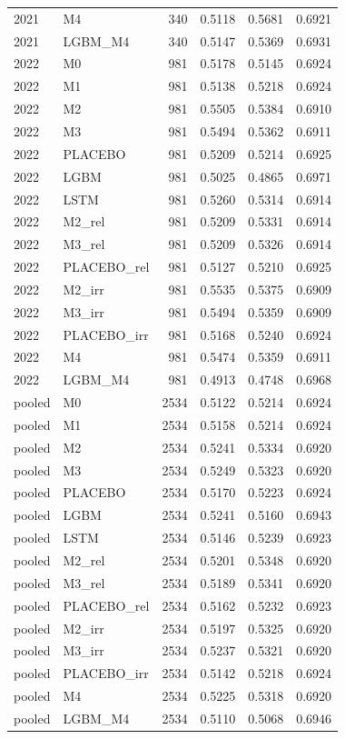 \begin{tabular}{llrrrr}
2021 & M4 & 340 & 0.5118 & 0.5681 & 0.6921 \\
2021 & LGBM\_M4 & 340 & 0.5147 & 0.5369 & 0.6931 \\
2022 & M0 & 981 & 0.5178 & 0.5145 & 0.6924 \\
2022 & M1 & 981 & 0.5138 & 0.5218 & 0.6924 \\
2022 & M2 & 981 & 0.5505 & 0.5384 & 0.6910 \\
2022 & M3 & 981 & 0.5494 & 0.5362 & 0.6911 \\
2022 & PLACEBO & 981 & 0.5209 & 0.5214 & 0.6925 \\
2022 & LGBM & 981 & 0.5025 & 0.4865 & 0.6971 \\
2022 & LSTM & 981 & 0.5260 & 0.5314 & 0.6914 \\
2022 & M2\_rel & 981 & 0.5209 & 0.5331 & 0.6914 \\
2022 & M3\_rel & 981 & 0.5209 & 0.5326 & 0.6914 \\
2022 & PLACEBO\_rel & 981 & 0.5127 & 0.5210 & 0.6925 \\
2022 & M2\_irr & 981 & 0.5535 & 0.5375 & 0.6909 \\
2022 & M3\_irr & 981 & 0.5494 & 0.5359 & 0.6909 \\
2022 & PLACEBO\_irr & 981 & 0.5168 & 0.5240 & 0.6924 \\
2022 & M4 & 981 & 0.5474 & 0.5359 & 0.6911 \\
2022 & LGBM\_M4 & 981 & 0.4913 & 0.4748 & 0.6968 \\
pooled & M0 & 2534 & 0.5122 & 0.5214 & 0.6924 \\
pooled & M1 & 2534 & 0.5158 & 0.5214 & 0.6924 \\
pooled & M2 & 2534 & 0.5241 & 0.5334 & 0.6920 \\
pooled & M3 & 2534 & 0.5249 & 0.5323 & 0.6920 \\
pooled & PLACEBO & 2534 & 0.5170 & 0.5223 & 0.6924 \\
pooled & LGBM & 2534 & 0.5241 & 0.5160 & 0.6943 \\
pooled & LSTM & 2534 & 0.5146 & 0.5239 & 0.6923 \\
pooled & M2\_rel & 2534 & 0.5201 & 0.5348 & 0.6920 \\
pooled & M3\_rel & 2534 & 0.5189 & 0.5341 & 0.6920 \\
pooled & PLACEBO\_rel & 2534 & 0.5162 & 0.5232 & 0.6923 \\
pooled & M2\_irr & 2534 & 0.5197 & 0.5325 & 0.6920 \\
pooled & M3\_irr & 2534 & 0.5237 & 0.5321 & 0.6920 \\
pooled & PLACEBO\_irr & 2534 & 0.5142 & 0.5218 & 0.6924 \\
pooled & M4 & 2534 & 0.5225 & 0.5318 & 0.6920 \\
pooled & LGBM\_M4 & 2534 & 0.5110 & 0.5068 & 0.6946 \\
\bottomrule
\end{tabular}
